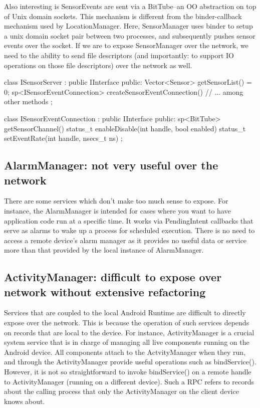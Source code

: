 \documentclass[prodmode]{acmlarge}
\begin{document}
Also interesting is SensorEvents are sent via a BitTube--an OO abstraction on top of Unix domain sockets. This mechanism is different from the binder-callback mechanism used by LocationManager. Here, SensorManager uses binder to setup a unix domain socket pair between two processes, and subsequently pushes sensor events over the socket. If we are to expose SensorManager over the network, we need to the ability to send file descriptors (and importantly: to support IO operations on those file descriptors) over the network as well.

\begin{snippet}
class ISensorServer : public IInterface {
public:
    Vector<Sensor> getSensorList() = 0;
    sp<ISensorEventConnection>
      createSensorEventConnection()
    // ... among other methods
};
\end{snippet}

\begin{snippet}
class ISensorEventConnection : public IInterface {
public:
    sp<BitTube> getSensorChannel()
    status_t enableDisable(int handle, bool enabled)
    status_t setEventRate(int handle, nsecs_t ns)
};
\end{snippet}

\subsection{AlarmManager: not very useful over the network}
There are some services which don't make too much sense to expose. For instance, the AlarmManager is intended for cases where you want to have application code run at a specific time. It works via PendingIntent callbacks that serve as alarms to wake up a process for scheduled execution. There is no need to access a remote device's alarm manager as it provides no useful data or service more than that provided by the local instance of AlarmManager.

\subsection{ActivityManager: difficult to expose over network without extensive refactoring}
Services that are coupled to the local Android Runtime are difficult to directly expose over the network. This is because the operation of such services depends on records that are local to the device. For instance, ActivityManager is a crucial system service that is in charge of managing all live components running on the Android device. All components attach to the ActvityManager when they run, and through the ActivityManager provide useful operations such as bindService(). However, it is not so straightforward to invoke bindService() on a remote handle to ActivityManager (running on a different device). Such a RPC refers to records about the calling process that only the ActivityManager on the client device knows about.
\end{document}
